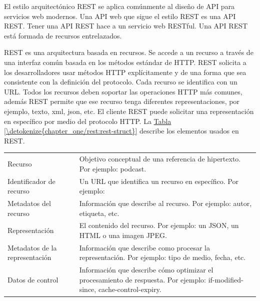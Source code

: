 El estilo arquitectónico REST se aplica comúnmente al diseño de API para
servicios web modernos. Una API web que sigue el estilo REST es una API REST.
Tener una API REST hace a un servicio web RESTful. Una API REST está formada de
recursos entrelazados.

\begin{remark}
REST es una arquitectura basada en recursos. Se accede a un recurso a través
de una interfaz común basada en los métodos estándar de HTTP. REST
solicita a los desarrolladores usar métodos HTTP explícitamente
y de una forma que sea consistente con la definición del protocolo.
Cada recurso se identifica con un URL. Todos los recursos deben soportar
las operaciones HTTP más comunes, además REST permite que ese recurso
tenga diferentes representaciones, por ejemplo, texto, xml, json, etc.
El cliente REST puede solicitar una representación en específico por
medio del protocolo HTTP. La \hyperref[\detokenize{chapter_one/rest:rest-struct}]{Tabla \ref{\detokenize{chapter_one/rest:rest-struct}}} describe
los elementos usados en REST.
\end{remark}


\begin{savenotes}\sphinxattablestart
\centering
{}
\label{\detokenize{chapter_one/rest:rest-struct}}
\sphinxaftercaption
\begin{tabulary}{\linewidth}[t]{|T|T|}
\hline
{}\relax &\relax \\
\hline
Recurso
&
Objetivo conceptual de una referencia de hipertexto. Por ejemplo: podcast.
\\
\hline
Identificador de recurso
&
Un URL que identifica un recurso en específico. Por ejemplo: 
\\
\hline
Metadatos del recurso
&
Información que describe al recurso. Por ejemplo: autor, etiqueta, etc.
\\
\hline
Representación
&
El contenido del recurso. Por ejemplo: un JSON, un HTML o una imagen JPEG.
\\
\hline
Metadatos de la representación
&
Información que describe como procesar la representación. Por ejemplo: tipo de medio, fecha, etc.
\\
\hline
Datos de control
&
Información que describe cómo optimizar el procesamiento de respuesta. Por ejemplo: if-modified-since, cache-control-expiry.
\\
\hline
\end{tabulary}
\par
\sphinxattableend\end{savenotes}


